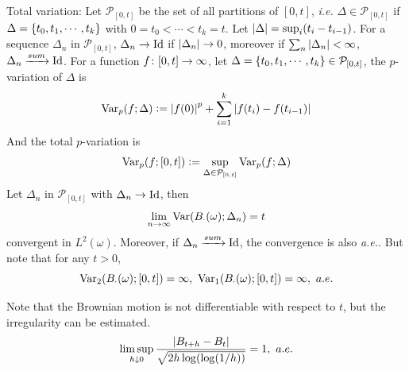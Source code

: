 \documentclass[a4paper,12pt]{article}
\begin{document}
\begin{itemize}
  \noindent Total variation: Let $\mathcal{P}_{[0,t]}$ be the set of all partitions of $[0,t]$, \emph{i.e.} $\Delta \in \mathcal{P}_{[0,t]}$ if $\Delta = \left\{t_0,t_1,\cdots,t_k\right\}$ with $0=t_0<\cdots<t_k=t$. Let $\left\lvert\Delta\right\lvert = \sup_i(t_i-t_{i-1})$. For a sequence $\Delta_n$ in $\mathcal{P}_{[0,t]}$, $\Delta_n \rightarrow \operatorname{Id}$ if $\left\lvert\Delta_n\right\lvert\rightarrow 0$, moreover if $\sum_n \left\lvert\Delta_n\right\lvert < \infty$, $\Delta_n \xrightarrow{sum} \operatorname{Id}$. For a function $f \colon [0,t] \rightarrow \infty$, let $\Delta = \left\{t_0,t_1,\cdots,t_k\right\} \in \mathcal{P}_{[0,t]}$, the $p$-variation of $\Delta$ is
  \begin{equation*}
    \operatorname{Var}_p(f;\Delta)\vcentcolon= \left\lvert f(0)\right\lvert^p+\sum_{i=1}^k\left\lvert f(t_i)-f(t_{i-1})\right\lvert
  \end{equation*}
  And the total $p$-variation is
  \begin{equation*}
    \operatorname{Var}_p(f;[0,t]) \vcentcolon= \sup_{\Delta\in \mathcal{P}_{[0,t]}}\operatorname{Var}_p(f;\Delta)
  \end{equation*}
  Let $\Delta_n$ in $\mathcal{P}_{[0,t]}$ with $\Delta_n \rightarrow \operatorname{Id}$, then
  \begin{equation*}
    \lim_{n\rightarrow \infty}\operatorname{Var}(B_{\cdot}(\omega);\Delta_n)=t
  \end{equation*}
  convergent in $L^2(\omega)$. Moreover, if $\Delta_n \xrightarrow{sum} \operatorname{Id}$, the convergence is also \emph{a.e.}. But note that for any $t > 0$, 
  \begin{equation*}
    \operatorname{Var}_2(B_{\cdot}(\omega);[0,t])=\infty,~\operatorname{Var}_1(B_{\cdot}(\omega);[0,t])=\infty,~a.e.
  \end{equation*}

  \noindent Note that the Brownian motion is not differentiable with respect to $t$, but the irregularity can be estimated.
  \begin{equation*}
    \limsup_{h\downarrow 0} \frac{\left\lvert B_{t+h} - B_t\right\lvert}{\sqrt{2h\log (\log(1/h))}} = 1,~a.e.
  \end{equation*}
\end{itemize}
\end{document}
